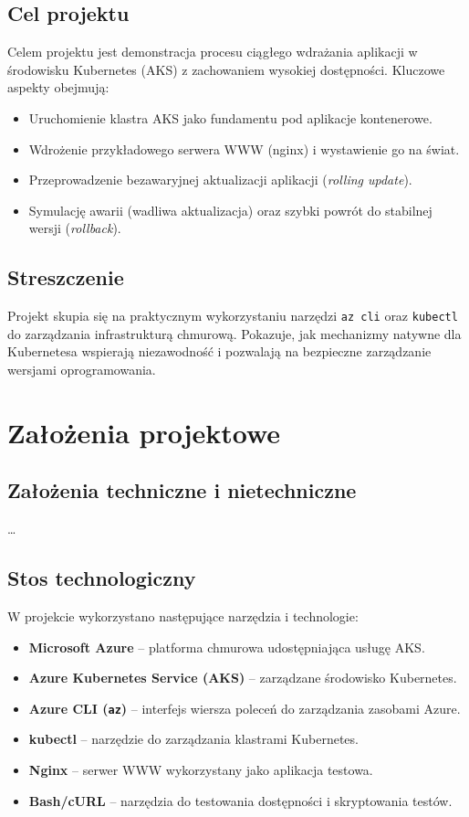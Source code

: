 \documentclass[12pt,a4paper]{article}
\begin{document}
\subsection{Cel projektu}
	Celem projektu jest demonstracja procesu ciągłego wdrażania aplikacji w środowisku Kubernetes (AKS) z zachowaniem wysokiej dostępności. Kluczowe aspekty obejmują:
	\begin{itemize}
		\item Uruchomienie klastra AKS jako fundamentu pod aplikacje kontenerowe.
		\item Wdrożenie przykładowego serwera WWW (nginx) i wystawienie go na świat.
		\item Przeprowadzenie bezawaryjnej aktualizacji aplikacji (\textit{rolling update}).
		\item Symulację awarii (wadliwa aktualizacja) oraz szybki powrót do stabilnej wersji (\textit{rollback}).
	\end{itemize}

\subsection{Streszczenie}
	Projekt skupia się na praktycznym wykorzystaniu narzędzi \texttt{az cli} oraz \texttt{kubectl} do zarządzania infrastrukturą chmurową. Pokazuje, jak mechanizmy natywne dla Kubernetesa wspierają niezawodność i pozwalają na bezpieczne zarządzanie wersjami oprogramowania.





\newpage
\section{Założenia projektowe}
\subsection{Założenia techniczne i nietechniczne}
	\ldots 

\subsection{Stos technologiczny}
	W projekcie wykorzystano następujące narzędzia i technologie:
	\begin{itemize}
		\item \textbf{Microsoft Azure} -- platforma chmurowa udostępniająca usługę AKS.
		\item \textbf{Azure Kubernetes Service (AKS)} -- zarządzane środowisko Kubernetes.
		\item \textbf{Azure CLI (\texttt{az})} -- interfejs wiersza poleceń do zarządzania zasobami Azure.
		\item \textbf{kubectl} -- narzędzie do zarządzania klastrami Kubernetes.
		\item \textbf{Nginx} -- serwer WWW wykorzystany jako aplikacja testowa.
		\item \textbf{Bash/cURL} -- narzędzia do testowania dostępności i skryptowania testów.
	\end{itemize}
\end{document}
